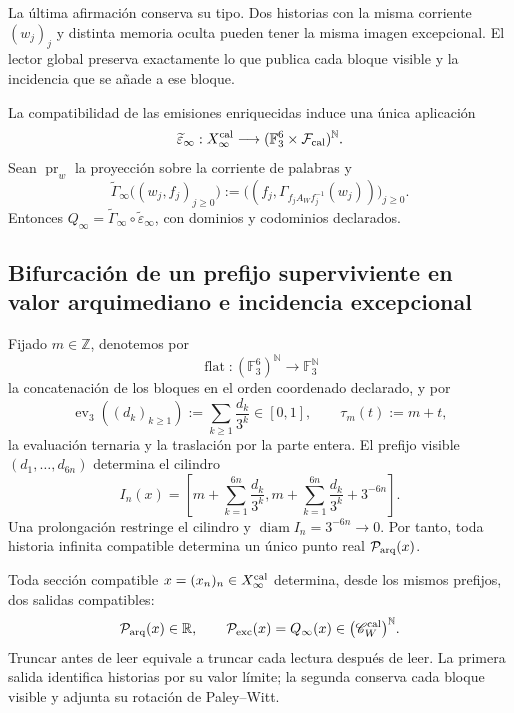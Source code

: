 La última afirmación conserva su tipo. Dos historias con la misma corriente
\((w_j)_j\) y distinta memoria oculta pueden tener la misma imagen
excepcional. El lector global preserva exactamente lo que publica cada bloque
visible y la incidencia que se añade a ese bloque.

La compatibilidad de las emisiones enriquecidas induce una única aplicación
\[
 \widetilde\varepsilon_\infty:X_\infty^{\rm cal}
 \longrightarrow
 (\mathbb F_3^6\times\mathcal F_{\rm cal})^{\mathbb N}.
\]
Sean \(\operatorname{pr}_w\) la proyección sobre la corriente de palabras y
\[
 \widetilde\Gamma_\infty
 \bigl((w_j,f_j)_{j\ge0}\bigr)
 :=\bigl(
   (f_j,\Gamma_{f_jA_Wf_j^{-1}}(w_j))
 \bigr)_{j\ge0}.
\]
Entonces
\(Q_\infty=\widetilde\Gamma_\infty
\circ\widetilde\varepsilon_\infty\), con dominios y codominios declarados.

\subsection{Bifurcación de un prefijo superviviente en valor arquimediano e incidencia excepcional}

Fijado \(m\in\mathbb Z\), denotemos por
\[
 \operatorname{flat}:(\mathbb F_3^6)^{\mathbb N}
 \longrightarrow\mathbb F_3^{\mathbb N}
\]
la concatenación de los bloques en el orden coordenado declarado, y por
\[
 \operatorname{ev}_3((d_k)_{k\ge1})
 :=\sum_{k\ge1}\frac{d_k}{3^k}\in[0,1],
 \qquad
 \tau_m(t):=m+t,
\]
la evaluación ternaria y la traslación por la parte entera. El prefijo visible
\((d_1,\ldots,d_{6n})\) determina el cilindro
\[
I_n(x)=
\left[
m+\sum_{k=1}^{6n}\frac{d_k}{3^k},
m+\sum_{k=1}^{6n}\frac{d_k}{3^k}+3^{-6n}
\right].
\]
Una prolongación restringe el cilindro y
\(\operatorname{diam}I_n=3^{-6n}\to0\). Por tanto, toda historia infinita
compatible determina un único punto real
\(\mathcal P_{\rm arq}(x)\).

\begin{theorem}
\label{p12-83-c17-s2:thm:doble-realizacion-global-rev6}
\label{thm:doble-realizacion-global-rev6}
Toda sección compatible \(x=(x_n)_n\in X_\infty^{\rm cal}\) determina,
desde los mismos prefijos, dos salidas compatibles:
\[
\mathcal P_{\rm arq}(x)\in\mathbb R,
\qquad
\mathcal P_{\rm exc}(x)=Q_\infty(x)
\in\bigl(\mathscr C_W^{\rm cal}\bigr)^{\mathbb N}.
\]
Truncar antes de leer equivale a truncar cada lectura después de leer. La
primera salida identifica historias por su valor límite; la segunda conserva
cada bloque visible y adjunta su rotación de Paley--Witt.
\end{theorem}


